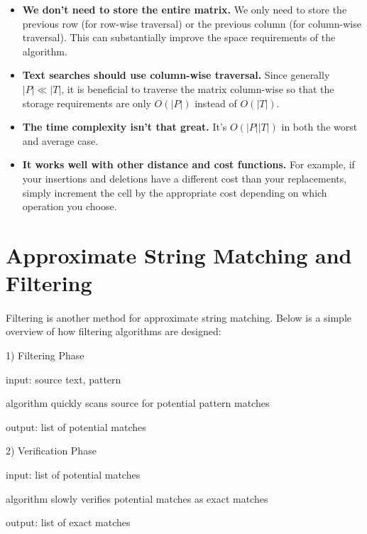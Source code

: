 \documentclass[10pt]{article}
\begin{document}
\begin{itemize}

\item \textbf{We don't need to store the entire matrix.} We only need to store
the previous row (for row-wise traversal) or the previous column (for column-wise
traversal). This can substantially improve the space requirements of the
algorithm.

\item \textbf{Text searches should use column-wise traversal.} Since generally
$|P| \ll |T|$, it is beneficial to traverse the matrix column-wise so that the
storage requirements are only $O(|P|)$ instead of $O(|T|)$.

\item \textbf{The time complexity isn't that great.} It's $O(|P||T|)$ in both
the worst and average case.

\item \textbf{It works well with other distance and cost functions.} For example,
if your insertions and deletions have a different cost than your replacements,
simply increment the cell by the appropriate cost depending on which operation
you choose.

\end{itemize}



\section*{Approximate String Matching and Filtering}

\paragraph{}Filtering is another method for approximate string matching. Below is a simple overview of how filtering algorithms are designed:

\begin{list}{}{}
\item 1) Filtering Phase
\begin{list}{*}{}
\item input: source text, pattern
\item algorithm quickly scans source for potential pattern matches
\item output: list of potential matches
\end{list}
\item 2) Verification Phase
\begin{list}{*}{}
\item input: list of potential matches
\item algorithm slowly verifies potential matches as exact matches
\item output: list of exact matches
\end{list}
\end{list}
\end{document}
